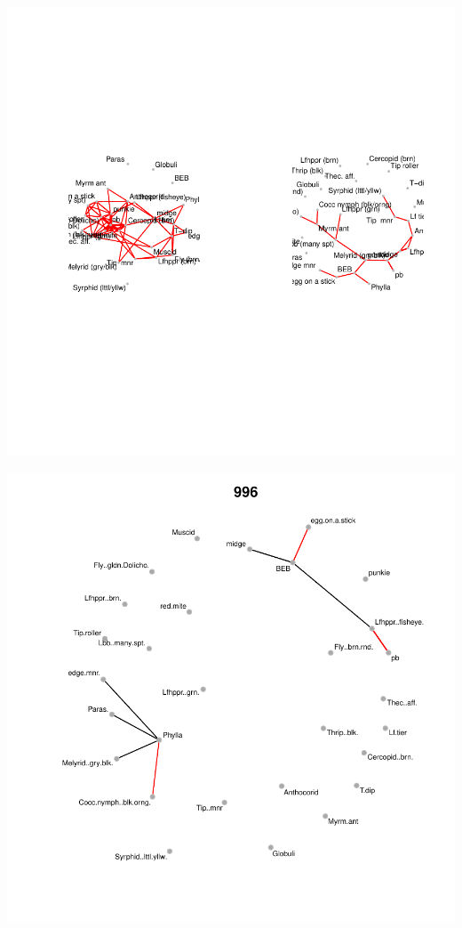 \documentclass[12pt]{article}
\begin{document}
\includegraphics{pb_removal-019}

\includegraphics{pb_removal-020}
\end{document}
